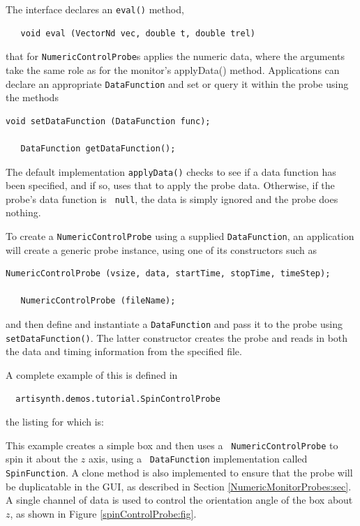 The  interface
declares an {\tt eval()} method,
%
\begin{verbatim}
   void eval (VectorNd vec, double t, double trel)
\end{verbatim}
%
that for 
{\tt NumericControlProbe}s applies the numeric data, 
where the arguments take the same role as for the monitor's %
{applyData()}
method. Applications can declare an appropriate {\tt DataFunction} and
set or query it within the probe using the methods
%
\begin{lstlisting}[]
   void setDataFunction (DataFunction func);

   DataFunction getDataFunction();
\end{lstlisting}
%
The default implementation {\tt applyData()} checks to see
if a data function has been specified, and if so, uses that to
apply the probe data. Otherwise, if the probe's data function is {\tt
null}, the data is simply ignored and the probe does nothing.

To create a {\tt NumericControlProbe} using a supplied {\tt DataFunction},
an application will create a generic probe instance, using one
of its constructors such as 
%
\begin{lstlisting}[]
   NumericControlProbe (vsize, data, startTime, stopTime, timeStep);

   NumericControlProbe (fileName);
\end{lstlisting}
%
and then define and instantiate a {\tt DataFunction} and pass it to
the probe using {\tt setDataFunction()}. The latter constructor
creates the probe and reads in both the data and timing information
from the specified file.

A complete example
of this is defined in
%
\begin{verbatim}
  artisynth.demos.tutorial.SpinControlProbe
\end{verbatim}
%
the listing for which is:

\lstset{numbers=left}

\lstset{numbers=none}

This example creates a simple box and then uses a {\tt
NumericControlProbe} to spin it about the $z$ axis, using a {\tt
DataFunction} implementation called {\tt SpinFunction}. A clone method
is also implemented to ensure that the probe will be duplicatable in
the GUI, as described in Section \ref{NumericMonitorProbes:sec}.  A
single channel of data is used to control the orientation angle of the
box about $z$, as shown in Figure \ref{spinControlProbe:fig}.

